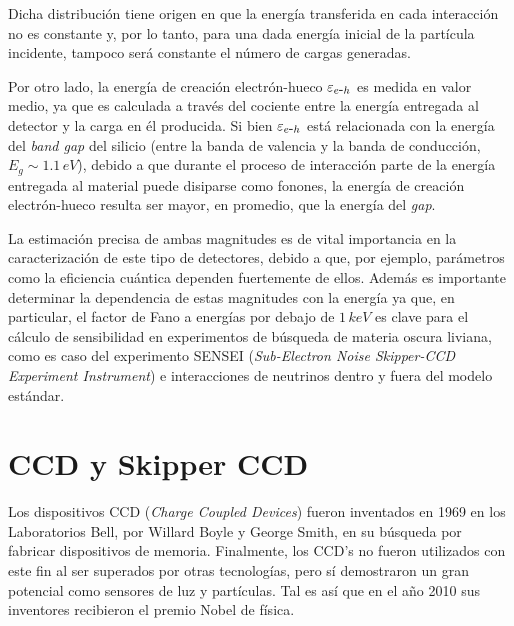 Dicha distribución tiene origen en que la energía transferida en cada interacción no es constante y, por lo tanto, para una dada energía inicial de la partícula incidente, tampoco será constante el número de cargas generadas.

Por otro lado, la energía de creación electrón-hueco $\varepsilon_{e\mbox{-}h}$ es medida en valor medio, ya que es calculada a través del cociente entre la energía entregada al detector y la carga en él producida. 
Si bien $\varepsilon_{e\mbox{-}h}$ está relacionada con la energía del \textit{band gap} del silicio (entre la banda de valencia y la banda de conducción, $E_{g}\sim 1.1\,\si{eV}$\cite{Janesick}), debido a que durante el proceso de interacción parte de la energía entregada al material puede disiparse como fonones, la energía de creación electrón-hueco resulta ser mayor, en promedio, que la energía del \textit{gap}.

La estimación precisa de ambas magnitudes es de vital importancia en la caracterización de este tipo de detectores, debido a que, por ejemplo, parámetros como la eficiencia cuántica dependen fuertemente de ellos. Además es importante determinar la dependencia de estas magnitudes con la energía ya que, en particular, el factor de Fano a energías por debajo de $1\,\si{keV}$ es clave para el cálculo de sensibilidad en experimentos de búsqueda de materia oscura liviana, como es caso del experimento SENSEI (\textit{Sub-Electron Noise Skipper-CCD Experiment Instrument})\cite{barak} e interacciones de neutrinos dentro\cite{moroni1} y fuera del modelo estándar\cite{moroni2}.

\section{CCD y Skipper CCD}
\noindent Los dispositivos CCD (\textit{Charge Coupled Devices}) fueron inventados en 1969 en los Laboratorios Bell, por Willard Boyle y George Smith, en su búsqueda por fabricar dispositivos de memoria. Finalmente, los CCD's no fueron utilizados con este fin al ser superados por otras tecnologías, pero sí demostraron un gran potencial como sensores de luz y partículas. Tal es así que en el año 2010 sus inventores recibieron el premio Nobel de física\cite{Boyle, Smith}.

